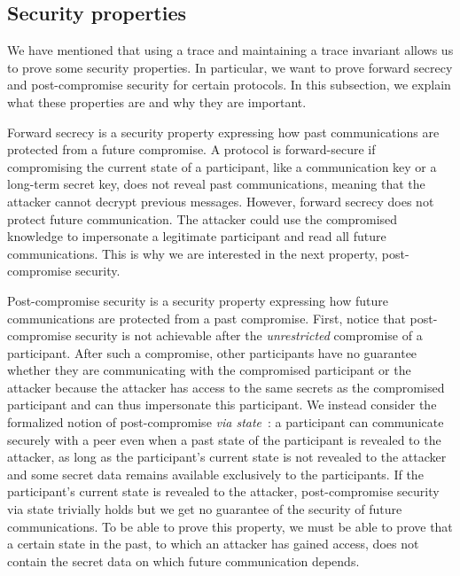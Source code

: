 \subsection{Security properties}
\label{sec:security-properties-def}

We have mentioned that using a trace and maintaining a trace invariant allows us to prove some security properties.
In particular, we want to prove forward secrecy and post-compromise security for certain protocols. In this subsection, we explain what these properties are and why they are important.

Forward secrecy is a security property expressing how past communications are protected from a future compromise.
A protocol is forward-secure if compromising the current state of a participant, like a communication key or a long-term secret key, does not reveal past communications, meaning that the attacker cannot decrypt previous messages.
However, forward secrecy does not protect future communication. The attacker could use the compromised knowledge to impersonate a legitimate participant and read all future communications.
This is why we are interested in the next property, post-compromise security.

Post-compromise security is a security property expressing how future communications are protected from a past compromise.
First, notice that post-compromise security is not achievable after the \emph{unrestricted} compromise of a participant.
After such a compromise, other participants have no guarantee whether they are communicating with the compromised participant or the attacker because the attacker has access to the same secrets as the compromised participant and can thus impersonate this participant.
We instead consider the formalized notion of post-compromise \emph{via state}~\cite{7536374}:
a participant can communicate securely with a peer even when a past state of the participant is revealed to the attacker, as long as the participant's current state is not revealed to the attacker and some secret data remains available exclusively to the participants.
If the participant's current state is revealed to the attacker, post-compromise security via state trivially holds but we get no guarantee of the security of future communications.
To be able to prove this property, we must be able to prove that a certain state in the past, to which an attacker has gained access, does not contain the secret data on which future communication depends.

